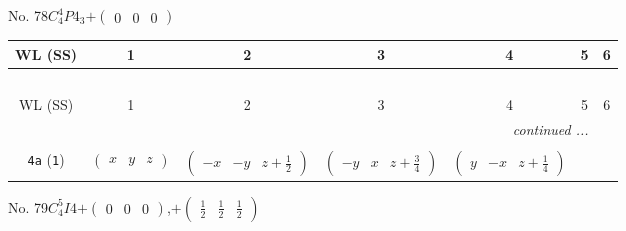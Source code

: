 \documentclass[fleqn,9pt,landscape]{jsarticle}
\begin{document}
\newpage
No. 78\quad$C_{4}^{4}$\quad$P4_3$\quad[ tetragonal ]\quad$+\begin{pmatrix} 0 & 0 & 0 \end{pmatrix}$
\begin{center}
\renewcommand{\arraystretch}{1.2}
\begin{longtable}{ccccccc}
 \hline \hline
WL (SS) & 1 & 2 & 3 & 4 & 5 & 6 \\ \hline \endfirsthead

\multicolumn{6}{l}{\tablename\ \thetable{}} \\
 \hline \hline
WL (SS) & 1 & 2 & 3 & 4 & 5 & 6 \\ \hline \endhead

 \hline \hline
\multicolumn{6}{r}{\footnotesize\it continued ...} \\ \endfoot

 \hline \hline
\multicolumn{6}{r}{} \\ \endlastfoot

{\tt 4a} ({\tt 1}) & $ \begin{pmatrix} x & y & z \end{pmatrix} $ & $ \begin{pmatrix} - x & - y & z + \frac{1}{2} \end{pmatrix} $ & $ \begin{pmatrix} - y & x & z + \frac{3}{4} \end{pmatrix} $ & $ \begin{pmatrix} y & - x & z + \frac{1}{4} \end{pmatrix} $ \\
\end{longtable}
\end{center}
\newpage
No. 79\quad$C_{4}^{5}$\quad$I4$\quad[ tetragonal ]\quad$+\begin{pmatrix} 0 & 0 & 0 \end{pmatrix}$,\quad $+\begin{pmatrix} \frac{1}{2} & \frac{1}{2} & \frac{1}{2} \end{pmatrix}$
\end{document}
